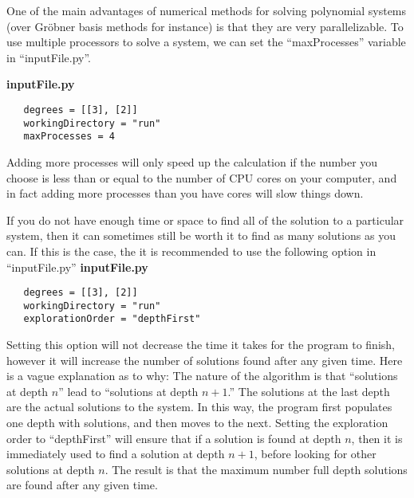 \documentclass[12pt]{article}
\theoremstyle{definition}
\begin{document}
One of the main advantages of numerical methods for solving polynomial 
systems (over Gr\"{o}bner basis methods for instance) is that they are 
very parallelizable. To use multiple processors to solve a system, we 
can set the ``maxProcesses'' variable in ``inputFile.py''.

\noindent \textbf{inputFile.py}
\begin{leftbar}
\vspace{-10pt} 
\begin{verbatim}
   degrees = [[3], [2]]
   workingDirectory = "run" 
   maxProcesses = 4
\end{verbatim}\vspace{-10pt} 
\end{leftbar}

Adding more processes will only speed up the calculation if the number 
you choose is less than or equal to the number of CPU cores on your 
computer, and in fact adding more processes than you have cores will 
slow things down.

If you do not have enough time or space to find all of the solution to a 
particular system, then it can sometimes still be worth it to find as 
many solutions as you can. If this is the case, the it is recommended to 
use the following option in ``inputFile.py''
\noindent \textbf{inputFile.py}
\begin{leftbar}
\vspace{-10pt} 
\begin{verbatim}
   degrees = [[3], [2]]
   workingDirectory = "run" 
   explorationOrder = "depthFirst"
\end{verbatim}\vspace{-10pt} 
\end{leftbar}
Setting this option will not decrease the time it takes for the program 
to finish, however it will increase the number of solutions 
found after any given time. Here is a vague explanation as to why: The 
nature of the algorithm is that ``solutions at depth $n$'' lead to 
``solutions at depth $n+1$.'' The solutions at the last depth are the 
actual solutions to the system. In this way, the program first populates 
one depth with solutions, and then moves to the next. Setting the 
exploration order to ``depthFirst'' will ensure that if a solution is 
found at depth $n$, then it is immediately used to find a solution at 
depth $n+1$, before looking for other solutions at depth $n$. The result 
is that the maximum number full depth solutions are found after any 
given time.
\end{document}
